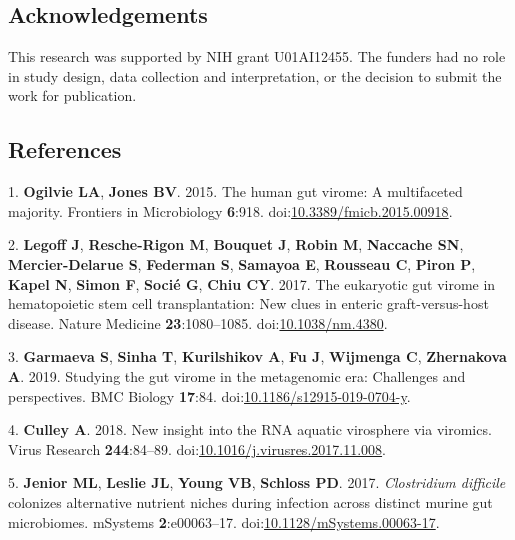 \documentclass[
  11pt,
]{article}
\begin{document}
\hypertarget{acknowledgements}{%
\subsection{Acknowledgements}\label{acknowledgements}}

This research was supported by NIH grant U01AI12455. The funders had no
role in study design, data collection and interpretation, or the
decision to submit the work for publication.

\newpage

\hypertarget{references}{%
\subsection{References}\label{references}}

\hypertarget{refs}{}
\leavevmode\hypertarget{ref-ogilvie_human_2015}{}%
1. \textbf{Ogilvie LA}, \textbf{Jones BV}. 2015. The human gut virome: A
multifaceted majority. Frontiers in Microbiology \textbf{6}:918.
doi:\href{https://doi.org/10.3389/fmicb.2015.00918}{10.3389/fmicb.2015.00918}.

\leavevmode\hypertarget{ref-legoff_eukaryotic_2017}{}%
2. \textbf{Legoff J}, \textbf{Resche-Rigon M}, \textbf{Bouquet J},
\textbf{Robin M}, \textbf{Naccache SN}, \textbf{Mercier-Delarue S},
\textbf{Federman S}, \textbf{Samayoa E}, \textbf{Rousseau C},
\textbf{Piron P}, \textbf{Kapel N}, \textbf{Simon F}, \textbf{Socié G},
\textbf{Chiu CY}. 2017. The eukaryotic gut virome in hematopoietic stem
cell transplantation: New clues in enteric graft-versus-host disease.
Nature Medicine \textbf{23}:1080--1085.
doi:\href{https://doi.org/10.1038/nm.4380}{10.1038/nm.4380}.

\leavevmode\hypertarget{ref-garmaeva_studying_2019}{}%
3. \textbf{Garmaeva S}, \textbf{Sinha T}, \textbf{Kurilshikov A},
\textbf{Fu J}, \textbf{Wijmenga C}, \textbf{Zhernakova A}. 2019.
Studying the gut virome in the metagenomic era: Challenges and
perspectives. BMC Biology \textbf{17}:84.
doi:\href{https://doi.org/10.1186/s12915-019-0704-y}{10.1186/s12915-019-0704-y}.

\leavevmode\hypertarget{ref-culley_new_2018}{}%
4. \textbf{Culley A}. 2018. New insight into the RNA aquatic virosphere
via viromics. Virus Research \textbf{244}:84--89.
doi:\href{https://doi.org/10.1016/j.virusres.2017.11.008}{10.1016/j.virusres.2017.11.008}.

\leavevmode\hypertarget{ref-jenior_clostridium_2017}{}%
5. \textbf{Jenior ML}, \textbf{Leslie JL}, \textbf{Young VB},
\textbf{Schloss PD}. 2017. \emph{Clostridium difficile} colonizes
alternative nutrient niches during infection across distinct murine gut
microbiomes. mSystems \textbf{2}:e00063--17.
doi:\href{https://doi.org/10.1128/mSystems.00063-17}{10.1128/mSystems.00063-17}.
\end{document}

